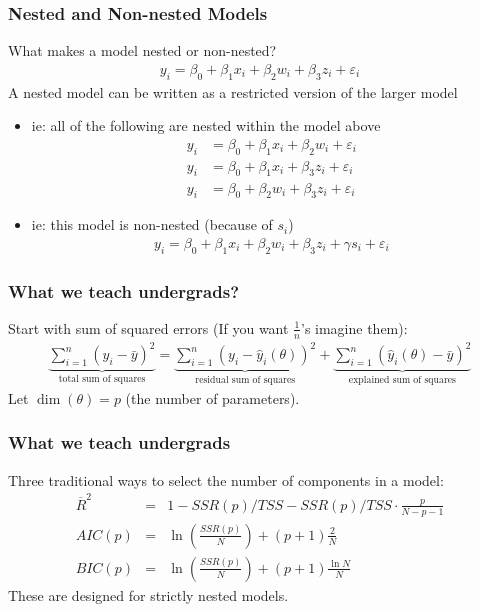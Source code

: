 \documentclass[aspectratio=169,11pt]{beamer}
\begin{document}
\begin{frame}
\frametitle{Nested and Non-nested Models}
What makes a model \alert{nested} or \alert{non-nested}?
\begin{align*}
y_i = \beta_0 + \beta_1 x_i + \beta_2 w_i + \beta_3 z_i + \varepsilon_i 
\end{align*}
A nested model can be written as a restricted version of the larger model
\begin{itemize}
\item ie: all of the following are nested within the model above
\begin{align*}
y_i &= \beta_0 + \beta_1 x_i + \beta_2 w_i + \varepsilon_i  \\
y_i &= \beta_0 + \beta_1 x_i + \beta_3 z_i + \varepsilon_i  \\
y_i &= \beta_0 + \beta_2 w_i + \beta_3 z_i + \varepsilon_i  
\end{align*}
\item ie: this model is non-nested (because of $s_i$)
\begin{align*}
y_i = \beta_0 + \beta_1 x_i + \beta_2 w_i + \beta_3 z_i + \gamma s_i +  \varepsilon_i 
\end{align*}
\end{itemize}
\end{frame}


\begin{frame}
\frametitle{What we teach undergrads?}
Start with sum of squared errors (If you want $\frac{1}{n}$'s imagine them):
\begin{align*}
\underbrace{\sum_{i=1}^{n}\left(y_{i}-\bar{y}\right)^{2}}_{\text{total sum of squares}}
=\underbrace{\sum_{i=1}^{n}\left(y_{i}-\hat{y}_{i}(\theta)\right)^{2}}_{\text{residual sum of squares}}
+\underbrace{\sum_{i=1}^{n}\left(\hat{y}_{i}(\theta)-\bar{y}\right)^{2}}_{\text{explained sum of squares}}
\end{align*}
Let $\dim(\theta)=p$ (the number of parameters).


\end{frame}




\begin{frame}
\frametitle{What we teach undergrads}
Three traditional ways to select the number of components in a model:\\
\begin{eqnarray*}
\overline{R}^2  &=& 1-SSR(p)/TSS - SSR(p)/TSS \cdot \frac{p}{N-p-1} \\
AIC(p) &=& \ln\left(\frac{SSR(p)}{N}\right) + (p+1)\frac{2}{N}\\
BIC(p) &=& \ln \left(\frac{SSR(p)}{N} \right) + (p+1)\frac{\ln N}{N}
\end{eqnarray*}
These are designed for strictly \alert{nested} models.
\end{frame}
\end{document}
